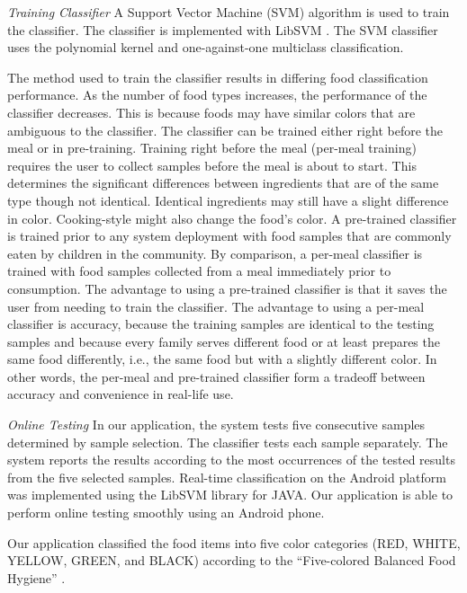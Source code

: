 \textit{Training Classifier}
\newline
A Support Vector Machine (SVM) algorithm is used to train the classifier. 
The classifier is implemented with LibSVM \cite{Chang:2011}. 
The SVM classifier uses the polynomial kernel and one-against-one multiclass classification.

The method used to train the classifier results in differing food classification performance. 
As the number of food types increases, the performance of the classifier decreases. 
This is because foods may have similar colors that are ambiguous to the classifier. 
The classifier can be trained either right before the meal or in pre-training. 
Training right before the meal (per-meal training) requires the user to collect samples before the meal is about to start. 
This determines the significant differences between ingredients that are of the same type though not identical. 
Identical ingredients may still have a slight difference in color. Cooking-style might also change the food's color. 
A pre-trained classifier is trained prior to any system deployment with food samples 
that are commonly eaten by children in the community. 
By comparison, a per-meal classifier is trained with food samples collected from a meal immediately prior to consumption. 
The advantage to using a pre-trained classifier is that it saves the user from needing to train the classifier. 
The advantage to using a per-meal classifier is accuracy, 
because the training samples are identical to the testing samples 
and because every family serves different food or at least prepares the same food differently, 
i.e., the same food but with a slightly different color. 
In other words, the per-meal and pre-trained classifier form a tradeoff between accuracy and convenience in real-life use. 

\textit{Online Testing}
\newline
In our application, the system tests five consecutive samples determined by sample selection. 
The classifier tests each sample separately. 
The system reports the results according to the most occurrences of the tested results from the five selected samples. 
Real-time classification on the Android platform was implemented using the LibSVM library for JAVA. 
Our application is able to perform online testing smoothly using an Android phone.

Our application classified the food items into five color categories (RED, WHITE, YELLOW, GREEN, 
and BLACK) according to the ``Five-colored Balanced Food Hygiene'' \cite{goshoku}. 

